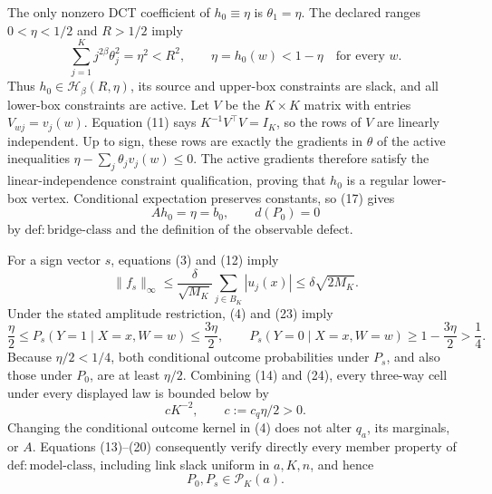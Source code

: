 The only nonzero DCT coefficient of \(h_0\equiv\eta\) is \(\theta_1=\eta\).  The declared ranges \(0<\eta<1/2\) and \(R>1/2\) imply
\[
\sum_{j=1}^Kj^{2\beta}\theta_j^2=\eta^2<R^2,
\qquad
\eta=h_0(w)<1-\eta
\quad\text{for every }w.
\tag{21}
\]
Thus \(h_0\in\mathcal H_\beta(R,\eta)\), its source and upper-box constraints are slack, and all lower-box constraints are active.  Let \(V\) be the \(K\times K\) matrix with entries \(V_{wj}=v_j(w)\).  Equation (11) says \(K^{-1}V^\top V=I_K\), so the rows of \(V\) are linearly independent.  Up to sign, these rows are exactly the gradients in \(\theta\) of the active inequalities \(\eta-\sum_j\theta_jv_j(w)\le0\).  The active gradients therefore satisfy the linear-independence constraint qualification, proving that \(h_0\) is a regular lower-box vertex.  Conditional expectation preserves constants, so (17) gives
\[
Ah_0=\eta=b_0,
\qquad
d(P_0)=0
\tag{22}
\]
by \(\mathrm{def:bridge\mbox{-}class}\) and the definition of the observable defect.

For a sign vector \(s\), equations (3) and (12) imply
\[
\|f_s\|_\infty
\le \frac{\delta}{\sqrt{M_K}}\sum_{j\in B_K}|u_j(x)|
\le\delta\sqrt{2M_K}.
\tag{23}
\]
Under the stated amplitude restriction, (4) and (23) imply
\[
\frac\eta2\le P_s(Y=1\mid X=x,W=w)\le\frac{3\eta}{2},
\qquad
P_s(Y=0\mid X=x,W=w)\ge1-\frac{3\eta}{2}>\frac14.
\tag{24}
\]
Because \(\eta/2<1/4\), both conditional outcome probabilities under \(P_s\), and also those under \(P_0\), are at least \(\eta/2\).  Combining (14) and (24), every three-way cell under every displayed law is bounded below by
\[
cK^{-2},
\qquad
c:=c_q\eta/2>0.
\tag{25}
\]
Changing the conditional outcome kernel in (4) does not alter \(q_a\), its marginals, or \(A\).  Equations (13)--(20) consequently verify directly every member property of \(\mathrm{def:model\mbox{-}class}\), including link slack uniform in \(a,K,n\), and hence
\[
P_0,P_s\in\mathcal P_K(a).
\tag{26}
\]

